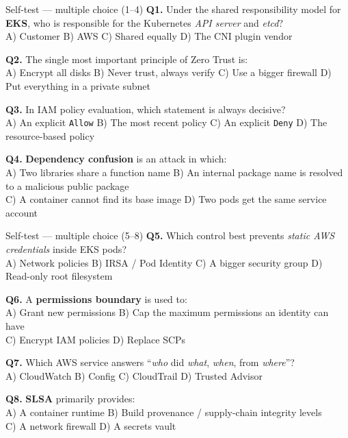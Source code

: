 \documentclass[aspectratio=169,10pt]{beamer}
\newcommand{\svc}[1]{{\color{accent}\textsf{\textbf{#1}}}}      %
\newcommand{\term}[1]{{\color{awsink}\textbf{#1}}}
\begin{document}
\begin{frame}{Self-test --- multiple choice (1--4)}
  \footnotesize
  \textbf{Q1.} Under the shared responsibility model for \svc{EKS}, who is responsible for the
  Kubernetes \emph{API server} and \emph{etcd}?\\
  \quad A) Customer \quad B) AWS \quad C) Shared equally \quad D) The CNI plugin vendor

  \vspace{0.6em}
  \textbf{Q2.} The single most important principle of Zero Trust is:\\
  \quad A) Encrypt all disks \quad B) Never trust, always verify \quad
  C) Use a bigger firewall \quad D) Put everything in a private subnet

  \vspace{0.6em}
  \textbf{Q3.} In IAM policy evaluation, which statement is always decisive?\\
  \quad A) An explicit \texttt{Allow} \quad B) The most recent policy \quad
  C) An explicit \texttt{Deny} \quad D) The resource-based policy

  \vspace{0.6em}
  \textbf{Q4.} \term{Dependency confusion} is an attack in which:\\
  \quad A) Two libraries share a function name \quad
  B) An internal package name is resolved to a malicious public package\\
  \quad C) A container cannot find its base image \quad
  D) Two pods get the same service account
\end{frame}

\begin{frame}[fragile]{Self-test --- multiple choice (5--8)}
  \footnotesize
  \textbf{Q5.} Which control best prevents \emph{static AWS credentials} inside EKS pods?\\
  \quad A) Network policies \quad B) IRSA / Pod Identity \quad
  C) A bigger security group \quad D) Read-only root filesystem

  \vspace{0.6em}
  \textbf{Q6.} A \term{permissions boundary} is used to:\\
  \quad A) Grant new permissions \quad B) Cap the maximum permissions an identity can have\\
  \quad C) Encrypt IAM policies \quad D) Replace SCPs

  \vspace{0.6em}
  \textbf{Q7.} Which AWS service answers ``\emph{who} did \emph{what}, \emph{when}, from \emph{where}''?\\
  \quad A) CloudWatch \quad B) Config \quad C) CloudTrail \quad D) Trusted Advisor

  \vspace{0.6em}
  \textbf{Q8.} \term{SLSA} primarily provides:\\
  \quad A) A container runtime \quad B) Build provenance / supply-chain integrity levels\\
  \quad C) A network firewall \quad D) A secrets vault
\end{frame}
\end{document}
